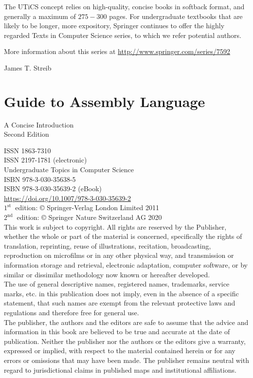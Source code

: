 \documentclass[10pt]{article}
\begin{document}
The UTiCS concept relies on high-quality, concise books in softback format, and generally a maximum of $275-300$ pages. For undergraduate textbooks that are likely to be longer, more expository, Springer continues to offer the highly regarded Texts in Computer Science series, to which we refer potential authors.

More information about this series at \href{http://www.springer.com/series/7592}{http://www.springer.com/series/7592}

James T. Streib

\section*{Guide to Assembly Language }
A Concise Introduction\\
Second Edition

ISSN 1863-7310\\
ISSN 2197-1781 (electronic)\\
Undergraduate Topics in Computer Science\\
ISBN 978-3-030-35638-5\\
ISBN 978-3-030-35639-2 (eBook)\\
\href{https://doi.org/10.1007/978-3-030-35639-2}{https://doi.org/10.1007/978-3-030-35639-2}\\
$1^{\text {st }}$ edition: © Springer-Verlag London Limited 2011\\
$2^{\text {nd }}$ edition: © Springer Nature Switzerland AG 2020\\
This work is subject to copyright. All rights are reserved by the Publisher, whether the whole or part of the material is concerned, specifically the rights of translation, reprinting, reuse of illustrations, recitation, broadcasting, reproduction on microfilms or in any other physical way, and transmission or information storage and retrieval, electronic adaptation, computer software, or by similar or dissimilar methodology now known or hereafter developed.\\
The use of general descriptive names, registered names, trademarks, service marks, etc. in this publication does not imply, even in the absence of a specific statement, that such names are exempt from the relevant protective laws and regulations and therefore free for general use.\\
The publisher, the authors and the editors are safe to assume that the advice and information in this book are believed to be true and accurate at the date of publication. Neither the publisher nor the authors or the editors give a warranty, expressed or implied, with respect to the material contained herein or for any errors or omissions that may have been made. The publisher remains neutral with regard to jurisdictional claims in published maps and institutional affiliations.
\end{document}
